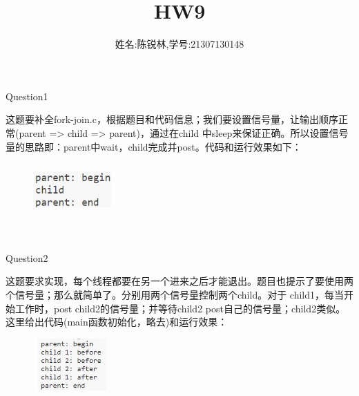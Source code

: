 \documentclass[12pt]{article}
\title{HW9}
\author{姓名:陈锐林,学号:21307130148}
\begin{document}
\maketitle
\begin{large}
    \noindent Question1\par
\end{large}
这题要补全fork-join.c，根据题目和代码信息；我们要设置信号量，让输出顺序正常(parent => child => parent)，通过在child
中sleep来保证正确。所以设置信号量的思路即：parent中wait，child完成并post。代码和运行效果如下：
\begin{figure}[!h]
    \centering
    \hfill
\end{figure}
\begin{figure}[h]
    \centering
    \includegraphics[width=3cm,height=2cm]{hw9-3.jpg}
\end{figure}\\
\begin{large}
    \noindent Question2\par
\end{large}
这题要求实现，每个线程都要在另一个进来之后才能退出。题目也提示了要使用两个信号量；那么就简单了。分别用两个信号量控制两个child。对于
child1，每当开始工作时，post child2的信号量；并等待child2 post自己的信号量；child2类似。这里给出代码(main函数初始化，略去)和运行效果：
\begin{figure}[h]
    \centering
    \includegraphics[width=3cm,height=2cm]{hw9-4.jpg}
\end{figure}
\end{document}
